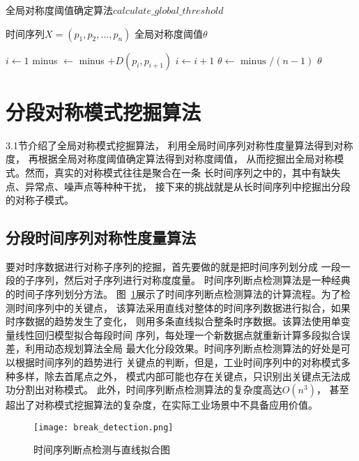 \renewcommand{\algorithmicrequire}{\textbf{输入：}\unskip}
\renewcommand{\algorithmicensure}{\textbf{输出：}\unskip}
\begin{algorithm}
  \caption{全局对称度阈值确定算法$calculate\_global\_threshold$}
  \label{alg:threshold1}
  \small
  \begin{algorithmic}
    \REQUIRE 时间序列$X=\left(p_{1}, p_{2}, \dots, p_{n}\right)$
    \ENSURE 全局对称度阈值$\theta$

    \STATE $i \leftarrow 1$
    \STATE minus $\leftarrow$ minus $+D\left(p_{i}, p_{i+1}\right)$
    \STATE $i \leftarrow i+1$
    \ENDWHILE
    \STATE $\theta \leftarrow {\text { minus }} / (n-1)$
    \RETURN $\theta$
  \end{algorithmic}
\end{algorithm}

\section{分段对称模式挖掘算法}

3.1节介绍了全局对称模式挖掘算法，
利用全局时间序列对称性度量算法得到对称度，
再根据全局对称度阈值确定算法得到对称度阈值，
从而挖掘出全局对称模式。然而，真实的对称模式往往是聚合在一条
长时间序列之中的，其中有缺失点、异常点、噪声点等种种干扰，
接下来的挑战就是从长时间序列中挖掘出分段的对称子模式。

\subsection{分段时间序列对称性度量算法}
要对时序数据进行对称子序列的挖掘，首先要做的就是把时间序列划分成
一段一段的子序列，然后对子序列进行对称度度量。
时间序列断点检测算法是一种经典的时间子序列划分方法。
图~\ref{fig:break_detection}展示了时间序列断点检测算法的计算流程。为了检测时间序列中的关键点，
该算法采用直线对整体的时间序列数据进行拟合，如果时序数据的趋势发生了变化，
则用多条直线拟合整条时序数据。该算法使用单变量线性回归模型拟合每段时间
序列，每处理一个新数据点就重新计算多段拟合误差，利用动态规划算法全局
最大化分段效果。时间序列断点检测算法的好处是可以根据时间序列的趋势进行
关键点的判断，但是，工业时间序列中的对称模式多种多样，除去首尾点之外，
模式内部可能也存在关键点，只识别出关键点无法成功分割出对称模式。
此外，时间序列断点检测算法的复杂度高达$O\left(n^{3}\right)$，
甚至超出了对称模式挖掘算法的复杂度，在实际工业场景中不具备应用价值。
\begin{figure}
  \centering
  \texttt{[image: break\_detection.png]}
  \caption{时间序列断点检测与直线拟合图}
  \label{fig:break_detection}
\end{figure}

